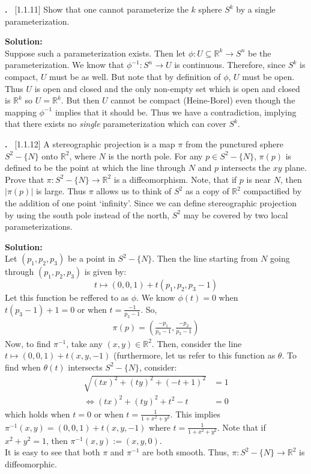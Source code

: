 \documentclass{article}
\newcounter{problem}
\newcounter{solution}
\newcommand\Problem{%
  \stepcounter{problem}%
  \textbf{\theproblem.}~%
  \setcounter{solution}{0}%
}
\newcommand\TheSolution{%
  \textbf{Solution:}\\%
}
\begin{document}
\Problem[1.1.11] Show that one cannot parameterize the $k$ sphere $S^k$ %
by a single parameterization.

\TheSolution Suppose such a parameterization exists. Then let %
$\phi: U\subseteq\mathbb{R}^k \to S^n$ be the parameterization. We know %
that $\phi^{-1}: S^n \to U$ is continuous. Therefore, since $S^k$ is %
compact, $U$ must be as well. But note that by definition of $\phi$, $U$ %
must be open. Thus $U$ is open and closed and the only non-empty set %
which is open and closed is $\mathbb{R}^k$ so $U=\mathbb{R}^k$. But then %
$U$ cannot be compact (Heine-Borel) even though the mapping $\phi^{-1}$ %
implies that it should be. Thus we have a contradiction, implying that %
there exists no \textit{single} parameterization which can cover $S^k$.

\Problem[1.1.12] A stereographic projection is a map $\pi$ from the %
punctured sphere $S^2-\{N\}$ onto $\mathbb{R}^2$, where $N$ is the %
north pole. For any $p\in S^2-\{N\}$, $\pi(p)$ is defined to be the %
point at which the line through $N$ and $p$ intersects the $xy$ plane.
Prove that $\pi: S^2-\{N\}\to\mathbb{R}^2$ is a diffeomorphism. Note, %
that if $p$ is near $N$, then $|\pi(p)|$ is large. Thus $\pi$ allows %
us to think of $S^2$ as a copy of $\mathbb{R}^2$ compactified by the %
addition of one point ‘infinity’. Since we can define stereographic %
projection by using the south pole instead of the north, $S^2$ may be %
covered by two local parameterizations.

\TheSolution Let $(p_1,p_2,p_3)$ be a point in $S^2-\{N\}$. Then the %
line starting from $N$ going through $(p_1,p_2,p_3)$ is given by:
\[t \mapsto (0,0,1) + t(p_1,p_2,p_3-1)\]
Let this function be reffered to as $\phi$. We know $\phi(t)=0$ when %
$t(p_3-1)+1=0$ or when $t=\frac{-1}{p_3-1}$. So, 
\begin{align}
\pi(p)=(\frac{-p_1}{p_3-1},\frac{-p_2}{p_3-1})
\end{align}
Now, to find $\pi^{-1}$, take any $(x,y)\in\mathbb{R}^2$. Then, %
consider the line $t\mapsto (0,0,1)+t(x,y,-1)$ (furthermore, let us %
refer to this function as $\theta$. To find when $\theta(t)$ %
intersects $S^2-\{N\}$, consider:
\begin{align*}
    \sqrt{(tx)^2+(ty)^2+(-t+1)^2} &= 1 \\
    \Leftrightarrow (tx)^2+(ty)^2+t^2-t &= 0
\end{align*}
which holds when $t=0$ or when $t=\frac{1}{1+x^2+y^2}$. This implies %
$\pi^{-1}(x,y)=(0,0,1)+t(x,y,-1)$ where $t=\frac{1}{1+x^2+y^2}$. Note %
that if $x^2+y^2=1$, then $\pi^{-1}(x,y) := (x,y,0)$.\\
It is easy to see that both $\pi$ and $\pi^{-1}$ are both smooth. Thus, %
$\pi: S^2-\{N\}\to\mathbb{R}^2$ is diffeomorphic.
\end{document}
